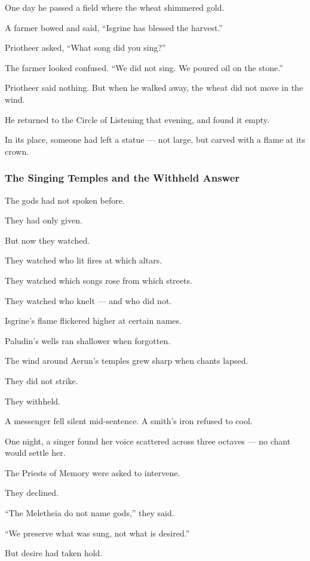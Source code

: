 \documentclass[12pt]{article}
\begin{document}
One day he passed a field where the wheat shimmered gold.  

A farmer bowed and said, “Isgrine has blessed the harvest.”

Priotheer asked,  
“What song did you sing?”

The farmer looked confused.  
“We did not sing. We poured oil on the stone.”

Priotheer said nothing.  
But when he walked away, the wheat did not move in the wind.

He returned to the Circle of Listening that evening, and found it empty.

In its place, someone had left a statue — not large,  
but carved with a flame at its crown.

\dotfill

\subsubsection*{The Singing Temples and the Withheld Answer}

The gods had not spoken before.

They had only given.

But now they watched.

They watched who lit fires at which altars.  

They watched which songs rose from which streets.  

They watched who knelt — and who did not.

Isgrine’s flame flickered higher at certain names.  

Paludin’s wells ran shallower when forgotten. 

The wind around Aerun’s temples grew sharp when chants lapsed.

They did not strike.  

They withheld.

A messenger fell silent mid-sentence.  
A smith’s iron refused to cool.  

One night, a singer found her voice scattered across three octaves — no chant would settle her.

The Priests of Memory were asked to intervene. 

They declined.  

 “The Meletheia do not name gods,” they said. 
 
 “We preserve what was sung, not what is desired.”

But desire had taken hold.
\end{document}
